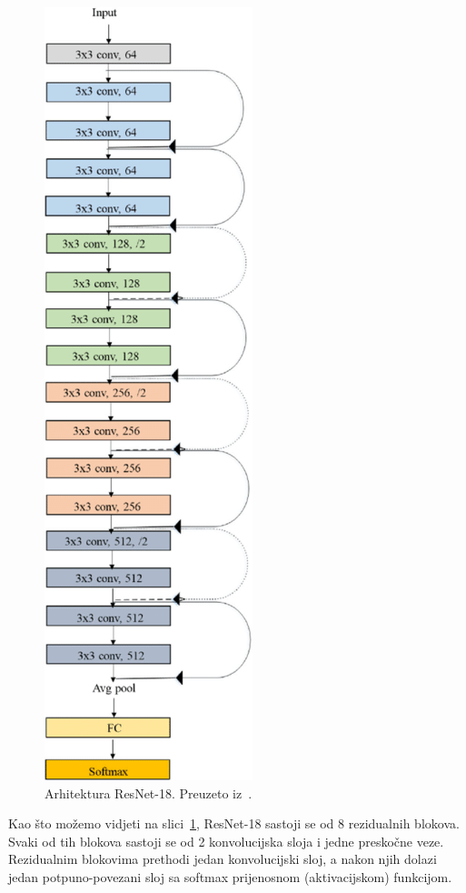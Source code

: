 \documentclass[times, utf8, zavrsni, numeric]{fer}
\begin{document}
\begin{figure}[htb]
    \centering
    \includegraphics[scale=0.7]{resnet18.png}
    \caption{Arhitektura ResNet-18. Preuzeto iz~\cite{mcc19}.}
    \label{fig:resnet-18}
\end{figure}

Kao što možemo vidjeti na slici~\ref{fig:resnet-18}, ResNet-18 sastoji se od 8 rezidualnih blokova. Svaki od tih blokova sastoji se od 2 konvolucijska sloja i jedne preskočne veze.
Rezidualnim blokovima prethodi jedan konvolucijski sloj, a nakon njih dolazi jedan potpuno-povezani sloj sa softmax prijenosnom (aktivacijskom) funkcijom.
\end{document}
